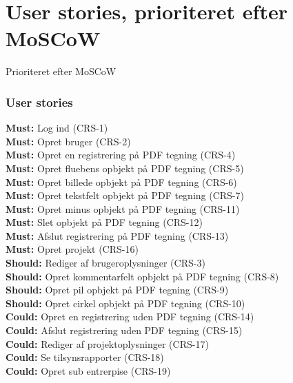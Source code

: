 \section{User stories, prioriteret efter MoSCoW} \label{sec:MoSCoW}
Prioriteret efter MoSCoW

\subsubsection{User stories}
\textbf{Must:} Log ind (CRS-1) \\
\textbf{Must:} Opret bruger (CRS-2) \\
\textbf{Must:} Opret en registrering på PDF tegning (CRS-4) \\
\textbf{Must:} Opret fluebens opbjekt på PDF tegning (CRS-5) \\
\textbf{Must:} Opret billede opbjekt på PDF tegning (CRS-6) \\
\textbf{Must:} Opret tekstfelt opbjekt på PDF tegning (CRS-7) \\
\textbf{Must:} Opret minus opbjekt på PDF tegning (CRS-11) \\
\textbf{Must:} Slet opbjekt på PDF tegning (CRS-12) \\
\textbf{Must:} Afslut registrering på PDF tegning (CRS-13) \\
\textbf{Must:} Opret projekt (CRS-16) \\

\textbf{Should:} Rediger af brugeroplysninger (CRS-3) \\
\textbf{Should:} Opret kommentarfelt opbjekt på PDF tegning (CRS-8) \\
\textbf{Should:} Opret pil opbjekt på PDF tegning (CRS-9) \\
\textbf{Should:} Opret cirkel opbjekt på PDF tegning (CRS-10) \\

\textbf{Could:} Opret en registrering uden PDF tegning (CRS-14) \\
\textbf{Could:} Afslut registrering uden PDF tegning (CRS-15) \\
\textbf{Could:} Rediger af projektoplysninger (CRS-17) \\
\textbf{Could:} Se tilsynsrapporter (CRS-18) \\
\textbf{Could:} Opret sub entrerpise (CRS-19) \\

